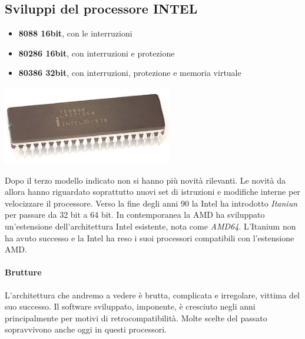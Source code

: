 \subsection{Sviluppi del processore INTEL}
\begin{multicols}{2}
	\small
	\begin{itemize}
		\item \textbf{8088 16bit}, con le interruzioni
		\item \textbf{80286 16bit}, con interruzioni e protezione
		\item \textbf{80386 32bit}, con interruzioni, protezione e memoria virtuale
	\end{itemize}
	\normalsize
	\columnbreak
	\begin{center}
		\includegraphics[scale=.75]{img/131.PNG}
	\end{center}
\end{multicols}
\noindent Dopo il terzo modello indicato non si hanno più novità rilevanti. Le novità da allora hanno riguardato soprattutto nuovi set di istruzioni e modifiche interne per velocizzare il processore. Verso la fine degli anni 90 la Intel ha introdotto \emph{Itaniun} per passare da 32 bit a 64 bit. In contemporanea la AMD ha sviluppato un'estensione dell'architettura Intel esistente, nota come \emph{AMD64}. L'Itanium non ha avuto successo e la Intel ha reso i suoi processori compatibili con l'estensione AMD.

\paragraph{Brutture} L'architettura che andremo a vedere è brutta, complicata e irregolare, vittima del suo successo. Il software sviluppato, imponente, è cresciuto negli anni principalmente per motivi di retrocompatibilità. Molte scelte del passato sopravvivono anche oggi in questi processori. 
